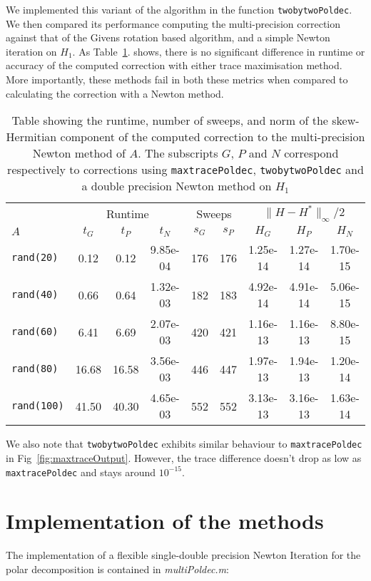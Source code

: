 \documentclass[10pt, A4paper]{article}
\begin{document}
We implemented this variant of the algorithm in the function
\texttt{twobytwoPoldec}.
We then compared its performance computing the multi-precision
correction against that of the Givens rotation based algorithm, and a
simple Newton iteration on $H_1$.
As Table~\ref{tab:GivPolNewComp}. shows, there is no significant
difference in runtime or accuracy of the computed correction with
either trace maximisation method.
More importantly, these methods fail in both these metrics when
compared to calculating the correction with a Newton method.
\begin{table}[t]
    \centering
    \begin{adjustbox}{center}
    \begin{tabular}{lcccccccc}
		\toprule
	 & \multicolumn{3}{c}{Runtime} & \multicolumn{2}{c}{Sweeps}&
	\multicolumn{3}{c}{$\|H - H^*\|_\infty / 2$}\\
	\cmidrule(lr){2-4} \cmidrule(lr){5-6} \cmidrule(lr){7-9}
    $A$ & $t_G$ & $t_P$ & $t_N$ & $s_G$ & $s_P$ & $H_G$ &
    $H_P$ & $H_N$ \\
		\midrule
\texttt{rand(20)}  & 0.12      & 0.12      & 9.85e-04  & 176       & 176       & 1.25e-14         & 1.27e-14         & 1.70e-15         \\
\texttt{rand(40)}  & 0.66      & 0.64      & 1.32e-03  & 182       & 183       & 4.92e-14         & 4.91e-14         & 5.06e-15         \\
\texttt{rand(60)}  & 6.41      & 6.69      & 2.07e-03  & 420       & 421       & 1.16e-13         & 1.16e-13         & 8.80e-15         \\
\texttt{rand(80)}  & 16.68     & 16.58     & 3.56e-03  & 446       & 447       & 1.97e-13         & 1.94e-13         & 1.20e-14         \\
\texttt{rand(100)} & 41.50     & 40.30     & 4.65e-03  & 552       & 552       & 3.13e-13         & 3.16e-13         & 1.63e-14         \\
  	\bottomrule
    \end{tabular}
	\end{adjustbox}
    \caption{\label{tab:GivPolNewComp}
    	Table showing the runtime, number of sweeps, and norm of the
    	skew-Hermitian component of the computed correction to the
    	multi-precision Newton method of $A$.
    	The subscripts $G$, $P$ and $N$ correspond respectively to
    	corrections using \texttt{maxtracePoldec},
    	\texttt{twobytwoPoldec} and a double precision Newton method on
		$H_1$
	}
\end{table}
We also note that \texttt{twobytwoPoldec} exhibits similar behaviour to
\texttt{maxtracePoldec} in Fig~\ref{fig:maxtraceOutput}.
However, the trace difference doesn't drop as low as
\texttt{maxtracePoldec} and stays around $10^{-15}$.


\section{Implementation of the methods}

The implementation of a flexible single-double precision Newton 
Iteration for the polar decomposition is contained in 
\emph{multiPoldec.m}:

{\small
}



\end{document}
